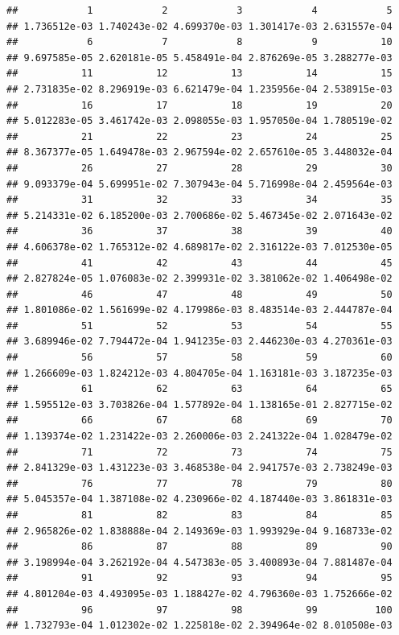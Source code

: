 \documentclass[
]{book}
\begin{document}
\begin{verbatim}
##            1            2            3            4            5 
## 1.736512e-03 1.740243e-02 4.699370e-03 1.301417e-03 2.631557e-04 
##            6            7            8            9           10 
## 9.697585e-05 2.620181e-05 5.458491e-04 2.876269e-05 3.288277e-03 
##           11           12           13           14           15 
## 2.731835e-02 8.296919e-03 6.621479e-04 1.235956e-04 2.538915e-03 
##           16           17           18           19           20 
## 5.012283e-05 3.461742e-03 2.098055e-03 1.957050e-04 1.780519e-02 
##           21           22           23           24           25 
## 8.367377e-05 1.649478e-03 2.967594e-02 2.657610e-05 3.448032e-04 
##           26           27           28           29           30 
## 9.093379e-04 5.699951e-02 7.307943e-04 5.716998e-04 2.459564e-03 
##           31           32           33           34           35 
## 5.214331e-02 6.185200e-03 2.700686e-02 5.467345e-02 2.071643e-02 
##           36           37           38           39           40 
## 4.606378e-02 1.765312e-02 4.689817e-02 2.316122e-03 7.012530e-05 
##           41           42           43           44           45 
## 2.827824e-05 1.076083e-02 2.399931e-02 3.381062e-02 1.406498e-02 
##           46           47           48           49           50 
## 1.801086e-02 1.561699e-02 4.179986e-03 8.483514e-03 2.444787e-04 
##           51           52           53           54           55 
## 3.689946e-02 7.794472e-04 1.941235e-03 2.446230e-03 4.270361e-03 
##           56           57           58           59           60 
## 1.266609e-03 1.824212e-03 4.804705e-04 1.163181e-03 3.187235e-03 
##           61           62           63           64           65 
## 1.595512e-03 3.703826e-04 1.577892e-04 1.138165e-01 2.827715e-02 
##           66           67           68           69           70 
## 1.139374e-02 1.231422e-03 2.260006e-03 2.241322e-04 1.028479e-02 
##           71           72           73           74           75 
## 2.841329e-03 1.431223e-03 3.468538e-04 2.941757e-03 2.738249e-03 
##           76           77           78           79           80 
## 5.045357e-04 1.387108e-02 4.230966e-02 4.187440e-03 3.861831e-03 
##           81           82           83           84           85 
## 2.965826e-02 1.838888e-04 2.149369e-03 1.993929e-04 9.168733e-02 
##           86           87           88           89           90 
## 3.198994e-04 3.262192e-04 4.547383e-05 3.400893e-04 7.881487e-04 
##           91           92           93           94           95 
## 4.801204e-03 4.493095e-03 1.188427e-02 4.796360e-03 1.752666e-02 
##           96           97           98           99          100 
## 1.732793e-04 1.012302e-02 1.225818e-02 2.394964e-02 8.010508e-03
\end{verbatim}
\end{document}
